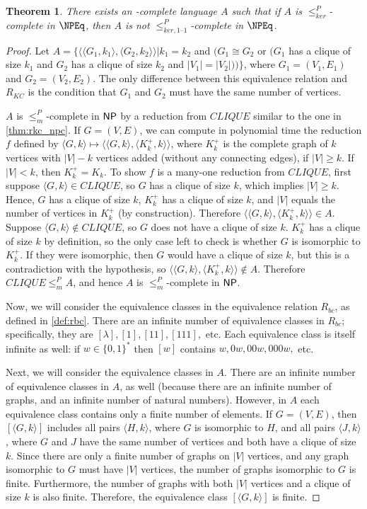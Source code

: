 \documentclass{article}
\newtheorem{theorem}{Theorem}[section]
\theoremstyle{definition} \newtheorem{definition}[definition]{Definition}
\newcommand{\sigmastar}{\{0, 1\}^{*}} %
\newcommand{\kr}{\leq^{P}_{ker}} %
\newcommand{\kri}{\leq^{P}_{ker,1\text{--}1}} %
\newcommand{\mor}{\leq^{P}_{m}} %
\newcommand{\pair}[2]{\langle#1,#2\rangle} %
\begin{document}
\begin{theorem}
  There exists an \NP-complete language $A$ such that if $A$ is $\kr$-complete
  in $\NPEq$, then $A$ is not $\kri$-complete in $\NPEq$.
\end{theorem}
\begin{proof}
  Let $A=\{\pair{\pair{G_1}{k_1}}{\pair{G_2}{k_2}}| k_1=k_2$ and $(G_1\cong
  G_2$ or $(G_1$ has a clique of size $k_1$ and $G_2$ has a clique of size
  $k_2$ and $|V_1|=|V_2|))\}$, where $G_1=(V_1, E_1)$ and $G_2=(V_2, E_2)$. The
  only difference between this equivalence relation and $R_{KC}$ is the
  condition that $G_1$ and $G_2$ must have the same number of vertices.

  $A$ is $\mor$-complete in ${\mathsf{NP}}$ by a reduction from $CLIQUE$ similar to the
  one in \autoref{thm:rkc_npc}.  If $G=(V,E)$, we can compute in polynomial
  time the reduction $f$ defined by
  $\pair{G}{k}\mapsto\pair{\pair{G}{k}}{\pair{K^+_k}{k}}$, where $K^+_k$ is the
  complete graph of $k$ vertices with $|V|-k$ vertices added (without any
  connecting edges), if $|V|\geq k$. If $|V|<k$, then $K^+_k=K_k$. To show $f$
  is a many-one reduction from $CLIQUE$, first suppose $\pair{G}{k}\in CLIQUE$,
  so $G$ has a clique of size $k$, which implies $|V|\geq k$. Hence, $G$ has a
  clique of size $k$, $K^+_k$ has a clique of size $k$, and $|V|$ equals the
  number of vertices in $K^+_k$ (by construction). Therefore
  $\pair{\pair{G}{k}}{\pair{K^+_k}{k}}\in A$. Suppose $\pair{G}{k}\notin
  CLIQUE$, so $G$ does not have a clique of size $k$. $K^+_k$ has a clique of
  size $k$ by definition, so the only case left to check is whether $G$ is
  isomorphic to $K^+_k$. If they were isomorphic, then $G$ would have a clique
  of size $k$, but this is a contradiction with the hypothesis, so
  $\pair{\pair{G}{k}}{\pair{K^+_k}{k}}\notin A$. Therefore $CLIQUE\mor A$, and
  hence $A$ is $\mor$-complete in ${\mathsf{NP}}$.

  Now, we will consider the equivalence classes in the equivalence relation
  $R_{bc}$, as defined in \autoref{def:rbc}. There are an infinite number of
  equivalence classes in $R_{bc}$; specifically, they are $[\lambda], [1],
  [11], [111],$ etc. Each equivalence class is itself infinite as well: if
  $w\in\sigmastar$ then $[w]$ contains $w, 0w, 00w, 000w,$ etc.


  Next, we will consider the equivalence classes in $A$. There are an infinite
  number of equivalence classes in $A$, as well (because there are an infinite
  number of graphs, and an infinite number of natural numbers). However, in $A$
  each equivalence class contains only a finite number of elements. If
  $G=(V,E)$, then $[\pair{G}{k}]$ includes all pairs $\pair{H}{k}$, where $G$
  is isomorphic to $H$, and all pairs $\pair{J}{k}$, where $G$ and $J$ have the
  same number of vertices and both have a clique of size $k$. Since there are
  only a finite number of graphs on $|V|$ vertices, and any graph isomorphic to
  $G$ must have $|V|$ vertices, the number of graphs isomorphic to $G$ is
  finite. Furthermore, the number of graphs with both $|V|$ vertices and a
  clique of size $k$ is also finite. Therefore, the equivalence class
  $[\pair{G}{k}]$ is finite.


\end{proof}
\end{document}
